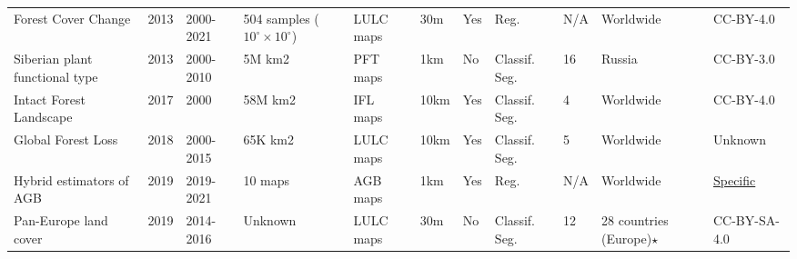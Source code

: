 \documentclass{CUP-JNL-DTM}%
\theoremstyle{definition}
\numberwithin{equation}{section}
\begin{document}
\begin{table*}[ht]
{\begin{fntable}
\begin{tabular}{p{1.5cm} | p{0.4cm} | p{1cm} | p{1.3cm} | p{1.2cm} : p{1cm} | p{0.4cm} | p{0.7cm} | p{0.8cm} | p{1cm} | p{1.1cm}}
Forest Cover Change	\cite{hansen_high-resolution_2013} & 2013 & 2000-2021 & 504 samples \newline  ($10^{\circ} \times 10^{\circ}$) & LULC maps & 30m & Yes & Reg. & N/A & Worldwide & CC-BY-4.0 \\

Siberian plant functional type \cite{ottle_use_2013} & 2013 & 2000-2010 & 5M km2 & PFT maps & 1km & No & Classif. \newline Seg. & 16 & Russia & CC-BY-3.0 \\

Intact Forest Landscape	\cite{potapov_last_2017} & 2017 & 2000    & 58M km2 & IFL maps & 10km & Yes & Classif. \newline Seg. & 4 & Worldwide & CC-BY-4.0 \\

Global Forest Loss	\cite{curtis_classifying_2018} & 2018 & 2000-2015 & 65K km2 & LULC maps & 10km & Yes & Classif. \newline Seg. & 5 & Worldwide & Unknown \\

Hybrid estimators of AGB \cite{patterson_statistical_2019} & 2019 & 2019-2021 & 10 maps & AGB maps & 1km & Yes & Reg. & N/A & Worldwide & \href{https://www.earthdata.nasa.gov/learn/use-data/data-use-policy?}{Specific} \\


Pan-Europe land cover \cite{pflugmacher_mapping_2019} & 2019 & 2014-2016 & Unknown & LULC maps & 30m & No & Classif. \newline Seg. & 12 & 28 countries (Europe)$\star$ & CC-BY-SA-4.0 \\

\bottomrule

\end{tabular}
\end{fntable}}
\label{tab:maps1}
\end{table*}
\end{document}
